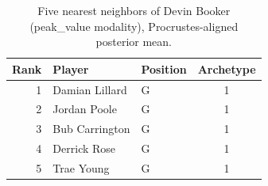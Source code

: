 \begin{table}[htbp]
  \centering\small
  \begin{tabular}{rllc}
    \toprule
    Rank & Player & Position & Archetype \\
    \midrule
    1 & Damian Lillard & G & 1 \\
    2 & Jordan Poole & G & 1 \\
    3 & Bub Carrington & G & 1 \\
    4 & Derrick Rose & G & 1 \\
    5 & Trae Young & G & 1 \\
    \bottomrule
  \end{tabular}
  \caption{Five nearest neighbors of Devin Booker (peak_value modality), Procrustes-aligned posterior mean.}
  \label{tab:Devin_Booker_neighbors_peak_value}
\end{table}

